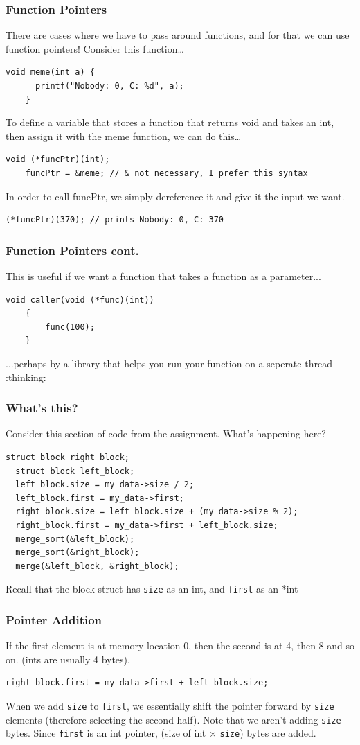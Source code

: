 \documentclass{beamer}
\begin{document}
\begin{frame}[fragile]
  \frametitle{Function Pointers}
  There are cases where we have to pass around functions, and for that we can use function pointers! Consider this function\dots
  \begin{lstlisting}[style=customc]
    void meme(int a) {
      printf("Nobody: 0, C: %d", a);
    }
  \end{lstlisting}
  To define a variable that stores a function that returns void and takes an int, then assign it with the meme function, we can do this\dots
  \begin{lstlisting}[style=customc]
    void (*funcPtr)(int);
    funcPtr = &meme; // & not necessary, I prefer this syntax
  \end{lstlisting}
  In order to call funcPtr, we simply dereference it and give it the input we want.
  \begin{lstlisting}[style=customc]
    (*funcPtr)(370); // prints Nobody: 0, C: 370
  \end{lstlisting}
\end{frame}
\begin{frame}[fragile]
  \frametitle{Function Pointers cont.}
  This is useful if we want a function that takes a function as a parameter...
  \begin{lstlisting}[style=customc]
    void caller(void (*func)(int)) 
    { 
        func(100);
    } 
  \end{lstlisting}
  ...perhaps by a library that helps you run your function on a seperate thread :thinking:
\end{frame}
\begin{frame}[fragile]
  \frametitle{What's this?}
  Consider this section of code from the assignment. What's happening here?
  \begin{lstlisting}[style=customc]
  struct block right_block;
  struct block left_block;
  left_block.size = my_data->size / 2;
  left_block.first = my_data->first;
  right_block.size = left_block.size + (my_data->size % 2);
  right_block.first = my_data->first + left_block.size;
  merge_sort(&left_block);
  merge_sort(&right_block);
  merge(&left_block, &right_block);
  \end{lstlisting}
  Recall that the block struct has \texttt{size} as an int, and \texttt{first} as an *int
\end{frame}
\begin{frame}[fragile]
  \frametitle{Pointer Addition}
  If the first element is at memory location 0, then the second is at 4, then 8 and so on. (ints are usually 4 bytes).
  \begin{lstlisting}[style=customc]
  right_block.first = my_data->first + left_block.size;
  \end{lstlisting}
  When we add \texttt{size} to \texttt{first}, we essentially shift the pointer forward by \texttt{size} elements (therefore selecting the second half). Note that we aren't adding \texttt{size} bytes. Since \texttt{first} is an int pointer, (size of int $\times$ \texttt{size}) bytes are added.
\end{frame}
\end{document}
